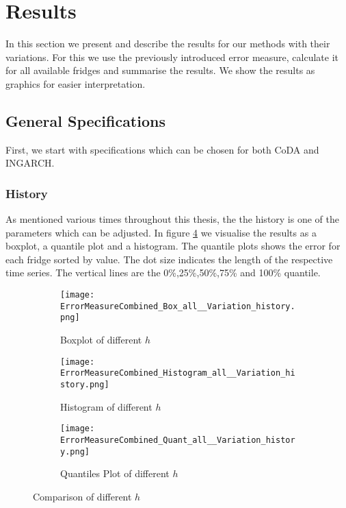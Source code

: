 \section{Results}
\label{sec:Results}

In this section we present and describe the results for our methods with their variations. For this we use the previously introduced error measure, calculate it for all available fridges and summarise the results. We show the results as graphics for easier interpretation. %

\subsection{General Specifications}
\label{sec:General Specifications}

First, we start with specifications which can be chosen for both CoDA and INGARCH. 

\subsubsection{History}
\label{sec:History}

As mentioned various times throughout this thesis, the the history is one of the parameters which can be adjusted. In figure \ref{fig:History Comp1} we visualise the results as a boxplot, a quantile plot and a histogram. The quantile plots shows the error for each fridge sorted by value. The dot size indicates the length of the respective time series. The vertical lines are the 0\%,25\%,50\%,75\% and 100\% quantile. 

\begin{figure}[htb!]
\centering
\begin{subfigure}[b]{0.45\textwidth}
\texttt{[image: ErrorMeasureCombined\_Box\_all\_\_Variation\_history.png]}
\caption{Boxplot of different $h$}
\label{fig:History Box}
\end{subfigure}
\hfill
\begin{subfigure}[b]{0.45\textwidth}
\texttt{[image: ErrorMeasureCombined\_Histogram\_all\_\_Variation\_history.png]}
\caption{Histogram of different $h$}
\label{fig:History Hist}
\end{subfigure}
\hfill
\begin{subfigure}[b]{0.8\textwidth}
\texttt{[image: ErrorMeasureCombined\_Quant\_all\_\_Variation\_history.png]}
\caption{Quantiles Plot of different $h$}
\label{fig:History Quant}
\end{subfigure}
\caption{Comparison of different $h$}
\label{fig:History Comp1}
\end{figure}

